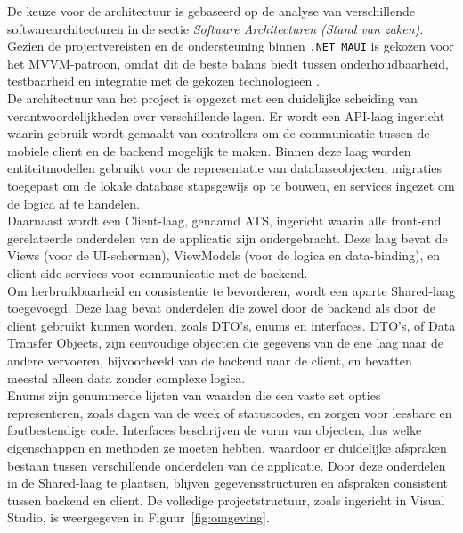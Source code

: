 De keuze voor de architectuur is gebaseerd op de analyse van verschillende softwarearchitecturen in de sectie \emph{Software Architecturen (Stand van zaken)}. Gezien de projectvereisten en de ondersteuning binnen \texttt{.NET MAUI} is gekozen voor het MVVM-patroon, omdat dit de beste balans biedt tussen onderhoudbaarheid, testbaarheid en integratie met de gekozen technologieën \autocite{Lou2016}.\\

De architectuur van het project is opgezet met een duidelijke scheiding van verantwoordelijkheden over verschillende lagen. Er wordt een API-laag ingericht waarin gebruik wordt gemaakt van controllers om de communicatie tussen de mobiele client en de backend mogelijk te maken. Binnen deze laag worden entiteitmodellen gebruikt voor de representatie van databaseobjecten, migraties toegepast om de lokale database stapsgewijs op te bouwen, en services ingezet om de logica af te handelen.\\

Daarnaast wordt een Client-laag, genaamd ATS, ingericht waarin alle front-end gerelateerde onderdelen van de applicatie zijn ondergebracht. Deze laag bevat de Views (voor de UI-schermen), ViewModels (voor de logica en data-binding), en client-side services voor communicatie met de backend. \\

Om herbruikbaarheid en consistentie te bevorderen, wordt een aparte Shared-laag toegevoegd. Deze laag bevat onderdelen die zowel door de backend als door de client gebruikt kunnen worden, zoals DTO’s, enums en interfaces. DTO’s, of Data Transfer Objects, zijn eenvoudige objecten die gegevens van de ene laag naar de andere vervoeren, bijvoorbeeld van de backend naar de client, en bevatten meestal alleen data zonder complexe logica.\\

Enums zijn genummerde lijsten van waarden die een vaste set opties representeren, zoals dagen van de week of statuscodes, en zorgen voor leesbare en foutbestendige code. Interfaces beschrijven de vorm van objecten, dus welke eigenschappen en methoden ze moeten hebben, waardoor er duidelijke afspraken bestaan tussen verschillende onderdelen van de applicatie. Door deze onderdelen in de Shared-laag te plaatsen, blijven gegevensstructuren en afspraken consistent tussen backend en client. De volledige projectstructuur, zoals ingericht in Visual Studio, is weergegeven in Figuur~\ref{fig:omgeving}.\\

